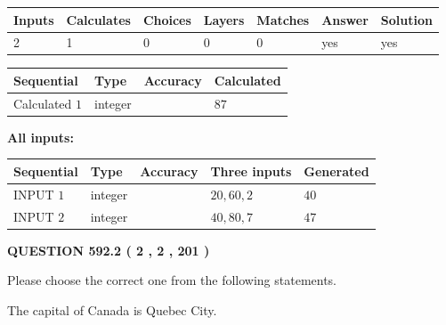 \documentclass[12pt]{article}
\begin{document}
 

 
   
   
   
   
\noindent\begin{tabular}{|l|l|l|l|l|l|l|}
 \hline
Inputs & Calculates & Choices & Layers & Matches & Answer & Solution \\ \hline
 2  & 
 1  & 
 0
  & 
 0  & 
 0  & 
  yes & 
  yes 
  \\ \hline
 \end{tabular}
   
   
   
   
\noindent{}
   
   
  
  
\noindent\begin{tabular}{|l|l|l|l|}
\hline
 Sequential & Type & Accuracy & Calculated \\ 
\hline
 
 
  Calculated $  1 $ & integer &  & 
  $ 87 $ 
 \\  \hline  
 \end{tabular}
   
   
   
   
\noindent\vspace{0.1in}\hspace{-0.08in} {\textbf{\Large{All inputs: }}}
   
   
  
  
\noindent\begin{tabular}{|l|l|l|l|l|}
\hline
 Sequential & Type & Accuracy & Three inputs & Generated \\ 
\hline
 
 
  INPUT $  1 $ & integer &  & $
 20
 , 
 60
 , 
 2
 $ & $ 40 $ 
 \\  \hline  
 
 
  INPUT $  2 $ & integer &  & $
 40
 , 
 80
 , 
 7
 $ & $ 47 $ 
 \\  \hline  
 \end{tabular}
   
   
  
\vspace{0.2in}
  
{\textbf{\Large{QUESTION
592.2 
 ( 2 , 2 , 201 )
}}}
  
  
Please choose the correct one from the following statements.
 
 
The capital of Canada is Quebec City.
 
\end{document}
